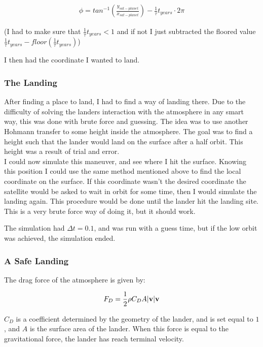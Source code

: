 \documentclass[a4paper, 10pt]{article}
\begin{document}
\begin{align}
\phi = tan^{-1}\left(\frac{y_{sat-planet}}{x_{sat-planet}} \right) - \frac{1}{\tau}t_{years}\cdot 2\pi
\end{align}

(I had to make sure that $\frac{1}{\tau}t_{years} < 1$ and if not I just subtracted the floored value $\frac{1}{\tau}t_{years} - floor(\frac{1}{\tau}t_{years})$)

I then had the coordinate I wanted to land.

\subsubsection{The Landing}
After finding a place to land, I had to find a way of landing there. Due to the difficulty of solving the landers interaction with the atmosphere in any smart way, this was done with brute force and guessing. The idea was to use another Hohmann transfer to some height inside the atmosphere. The goal was to find a height such that the lander would land on the surface after a half orbit. This height was a result of trial and error. \\

I could now simulate this maneuver, and see where I hit the surface. Knowing this position I could use the same method mentioned above to find the local coordinate on the surface. If this coordinate wasn't the desired coordinate the satellite would be asked to wait in orbit for some time, then I would simulate the landing again. This procedure would be done until the lander hit the landing site. This is a very brute force way of doing it, but it should work. 


The simulation had $\Delta t = 0.1$, and was run with a guess time, but if the low orbit was achieved, the simulation ended.

\subsubsection{A Safe Landing}

The drag force of the atmosphere is given by:

\begin{align}
F_D = \frac{1}{2}\rho C_D A |\bold{v}| \bold{v}
\end{align}

$C_D$ is a coefficient determined by the geometry of the lander, and is set equal to $1$, and $A$ is the surface area of the lander. When this force is equal to the gravitational force, the lander has reach terminal velocity.
\end{document}
